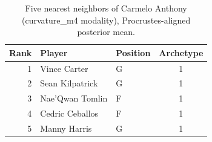 \begin{table}[htbp]
  \centering\small
  \begin{tabular}{rllc}
    \toprule
    Rank & Player & Position & Archetype \\
    \midrule
    1 & Vince Carter & G & 1 \\
    2 & Sean Kilpatrick & G & 1 \\
    3 & Nae'Qwan Tomlin & F & 1 \\
    4 & Cedric Ceballos & F & 1 \\
    5 & Manny Harris & G & 1 \\
    \bottomrule
  \end{tabular}
  \caption{Five nearest neighbors of Carmelo Anthony (curvature_m4 modality), Procrustes-aligned posterior mean.}
  \label{tab:Carmelo_Anthony_neighbors_curvature_m4}
\end{table}

